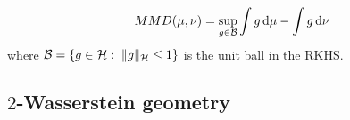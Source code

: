 \begin{align}
MMD(\mu,\nu) = \sup_{g\in \mathcal{B}} \int g\mathop{}\!\mathrm{d}\mu - \int g \mathop{}\!\mathrm{d}\nu
\end{align}
where $\mathcal{B} = \{ g\in {{\mathcal H}} : \; \Vert g\Vert_{{{\mathcal H}}}\leq 1 \}$  is the unit ball in the RKHS.


\subsection{$2$-Wasserstein geometry}\label{subsec:wasserstein_flow}

